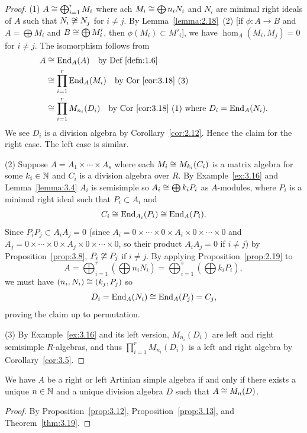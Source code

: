 \begin{proof}
(1) $A\cong\bigoplus^{r}_{i=1}M_{i}$ where ach $M_{i}\cong\bigoplus n_{i}N_{i}$
and $N_{i}$ are minimal right ideals of $A$ such that $N_{i}\not\cong N_{j}$
for $i\neq j$. By Lemma~\ref{lemma:2.18}~(2) [if $\phi\colon A\to B$ and
  $A=\bigoplus M_{i}$ and $B\cong\bigoplus M'_{i}$, then
  $\phi(M_{i})\subset M'_{i}$], we have $\hom_{A}(M_{i},M_{j})=0$ for
$i\neq j$. The isomorphism follows from
\begin{subequations}
  \begin{align}
A&\cong\operatorname{End}_{A}(A)\quad\mbox{by Def~\ref{defn:1.6}}\\
&\cong\prod^{r}_{i=1}\operatorname{End}_{A}(M_{i})\quad\mbox{by Cor~\ref{cor:3.18}~(3)}\\
&\cong\prod^{r}_{i=1}M_{n_{i}}(D_{i})\quad\mbox{by Cor~\ref{cor:3.18}~(1) where }
D_{i}=\operatorname{End}_{A}(N_{i}).
  \end{align}
\end{subequations}
We see $D_{i}$ is a division algebra by
Corollary~\ref{cor:2.12}. Hence the claim for the right case. The left
case is similar.

(2) Suppose $A=A_{1}\times\cdots\times A_{s}$ where each $M_{i}\cong M_{k_{i}}(C_{i})$
is a matrix algebra for some $k_{i}\in\mathbb{N}$ and $C_{i}$ is a division
algebra over $R$. By Example~\ref{ex:3.16} and Lemma~\ref{lemma:3.4}
$A_{i}$ is semisimple so $A_{i}\cong\bigoplus k_{i}P_{i}$ as
$A$-modules, where $P_{i}$ is a minimal right ideal such that
$P_{i}\subset A_{i}$ and
\begin{equation}
C_{i}\cong\operatorname{End}_{A_{i}}(P_{i})\cong\operatorname{End}_{A}(P_{i}).
\end{equation}
Since $P_{i}P_{j}\subset A_{i}A_{j}=0$ (since
$A_{i}=0\times\cdots\times0\times A_{i}\times0\times\cdots\times0$ and
$A_{j}=0\times\cdots\times0\times A_{j}\times0\times\cdots\times0$,
so their product $A_{i}A_{j}=0$ if $i\neq j$) by Proposition~\ref{prop:3.8},
$P_{i}\not\cong P_{j}$ if $i\neq j$.
By applying Proposition~\ref{prop:2.19} to
\begin{equation}
A=\bigoplus^{r}_{i=1}\left(\bigoplus
n_{i}N_{i}\right)=\bigoplus^{s}_{i=1}\left(\bigoplus k_{i}P_{i}\right),
\end{equation}
we must have $(n_{i},N_{i})\cong(k_{j},P_{j})$ so
\begin{equation}
D_{i}=\operatorname{End}_{A}(N_{i})\cong\operatorname{End}_{A}(P_{j})=C_{j},
\end{equation}
proving the claim up to permutation.

(3) By Example~\ref{ex:3.16} and its left version, $M_{n_{i}}(D_{i})$
are left and right semisimple $R$-algebras, and thus $\prod^{r}_{i=1}M_{n_{i}}(D_{i})$
is a left and right algebra by Corollary~\ref{cor:3.5}.
\end{proof}

\begin{corollary}\label{cor:3.20}
We have $A$ be a right or left Artinian simple algebra if and only if
there exists a unique $n\in\mathbb{N}$ and a unique division algebra $D$ such
that $A\cong M_{n}(D)$.
\end{corollary}

\begin{proof}
By Proposition~\ref{prop:3.12}, Proposition~\ref{prop:3.13}, and Theorem~\ref{thm:3.19}.
\end{proof}